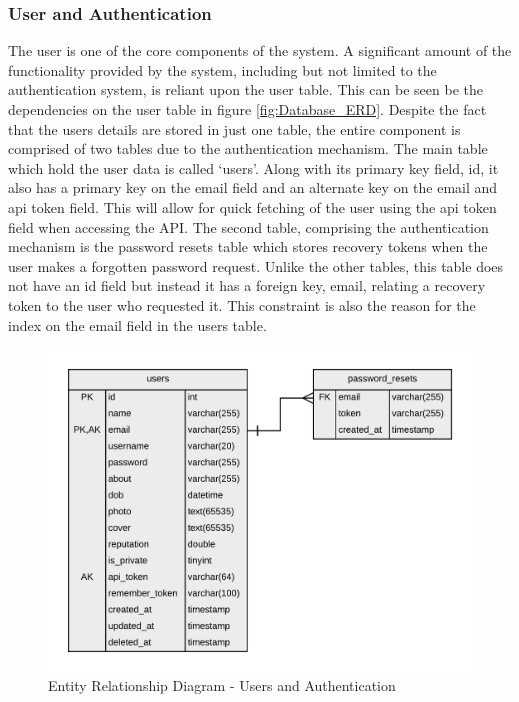 \subsubsection{User and Authentication}
The user is one of the core components of the system. A significant amount of the functionality provided by the system, including but not limited to the authentication system, is reliant upon the user table. This can be seen be the dependencies on the user table in figure \ref{fig:Database_ERD}. Despite the fact that the users details are stored in just one table, the entire component is comprised of two tables due to the authentication mechanism. The main table which hold the user data is called `users'. Along with its primary key field, id, it also has a primary key on the email field and an alternate key on the email and api token field. This will allow for quick fetching of the user using the api token field when accessing the API. The second table, comprising the authentication mechanism is the password resets table which stores recovery tokens when the user makes a forgotten password request. Unlike the other tables, this table does not have an id field but instead it has a foreign key, email, relating a recovery token to the user who requested it. This constraint is also the reason for the index on the email field in the users table.

\begin{figure}[H]
  \centering
  \includegraphics[width=1.0\textwidth]{Images/Design/Database/Users}
  \caption{Entity Relationship Diagram - Users and Authentication} \label{fig:ERD_Users}
\end{figure}

